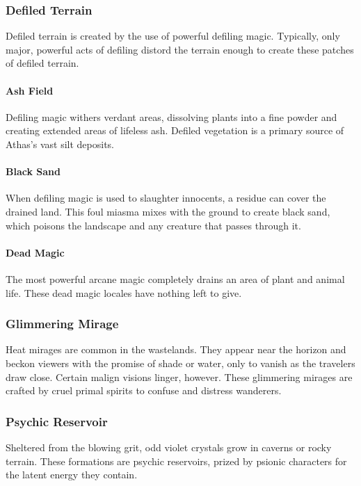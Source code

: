 \begin{multicols}{2}
\subsubsection{Defiled Terrain}
Defiled terrain is created by the use of powerful defiling
magic. Typically, only major, powerful acts of defiling distord
the terrain enough to create these patches of defiled terrain.

\paragraph{Ash Field}
Defiling magic withers verdant areas, dissolving
plants into a fine powder and creating extended areas
of lifeless ash. Defiled vegetation is a primary source
of Athas's vast silt deposits.

\paragraph{Black Sand}
When defiling magic is used to slaughter innocents, a
residue can cover the drained land. This foul miasma
mixes with the ground to create black sand, which
poisons the landscape and any creature that passes
through it.

\paragraph{Dead Magic}
The most powerful arcane magic completely drains an
area of plant and animal life. These dead magic
locales have nothing left to give.

\subsubsection{Glimmering Mirage}
Heat mirages are common in the wastelands. They
appear near the horizon and beckon viewers with
the promise of shade or water, only to vanish as
the travelers draw close. Certain malign visions
linger, however. These glimmering mirages are
crafted by cruel primal spirits to confuse and
distress wanderers.

\subsubsection{Psychic Reservoir}
Sheltered from the blowing grit, odd violet crystals grow
in caverns or rocky terrain. These formations are psychic
reservoirs, prized by psionic characters for the latent
energy they contain.


\end{multicols}

